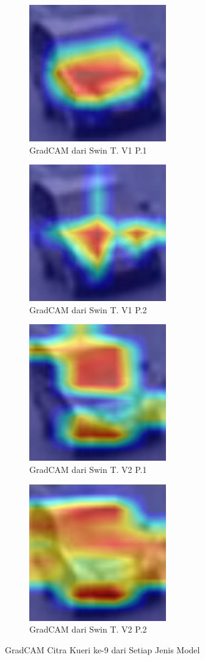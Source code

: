 \begin{figure}[h!]
  \centering
  \begin{subfigure}{.4\textwidth}
    \centering
    \includegraphics[width=.3\linewidth]{gambar/Que9_GradCAMV1P1IT3.jpg}
    \caption{GradCAM dari Swin T. V1 P.1}
    \label{gradcamkuerinomorsembilanV1P1}
  \end{subfigure}%
  \begin{subfigure}{.4\textwidth}
    \centering
    \includegraphics[width=.3\linewidth]{gambar/Que9_gradCAMV1P2IT2.jpg}
    \caption{GradCAM dari Swin T. V1 P.2}
    \label{gradcamkuerinomorsembilanV1P2}
  \end{subfigure}
  \begin{subfigure}{.4\textwidth}
    \centering
    \includegraphics[width=.3\linewidth]{gambar/Que9_V2P1IT1.png}
    \caption{GradCAM dari Swin T. V2 P.1}
    \label{gradcamkuerinomorsembilanV2P1}
  \end{subfigure}
  \begin{subfigure}{.4\textwidth}
    \centering
    \includegraphics[width=.3\linewidth]{gambar/Que9_V2P2IT3.png}
    \caption{GradCAM dari Swin T. V2 P.2}
    \label{gradcamkuerinomorsembilanV2P2}
  \end{subfigure}
  \caption{GradCAM Citra Kueri ke-9 dari Setiap Jenis Model}
  \label{fig:gradcamdarisetiapjenismodelpengujiankelima}
\end{figure}

